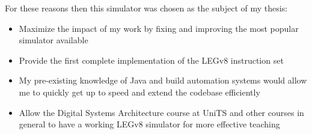 For these reasons then this simulator was chosen as the subject of my thesis:

\begin{itemize}[label=\textendash]
	\item Maximize the impact of my work by fixing and improving the most popular simulator available
	\item Provide the first complete implementation of the LEGv8 instruction set
	\item My pre-existing knowledge of Java and build automation systems would allow me to quickly get up to speed and extend the codebase efficiently
	\item Allow the Digital Systems Architecture course at UniTS and other courses in general to have a working LEGv8 simulator for more effective teaching
\end{itemize}
